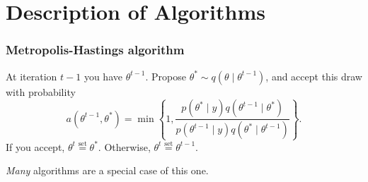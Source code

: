 \documentclass{beamer}
\begin{document}
\section{Description of Algorithms}
\begin{frame}
\frametitle{Metropolis-Hastings algorithm}

At iteration $t-1$ you have $\theta^{t-1}$. Propose $\theta^* \sim q(\theta \mid \theta^{t-1})$, and accept this draw with probability 
$$
a(\theta^{t-1}, \theta^*) = \min\left\{1, \frac{p(\theta^* \mid y)q(\theta^{t-1} \mid \theta^*) }{p(\theta^{t-1} \mid y) q(\theta^* \mid \theta^{t-1}) }\right\}.
$$
If you accept, $\theta^t \overset{\text{set}}{=} \theta^*$. Otherwise, $\theta^t \overset{\text{set}}{=} \theta^{t-1}$. 
\newline

{\it Many} algorithms are a special case of this one.

\end{frame}
\end{document}
